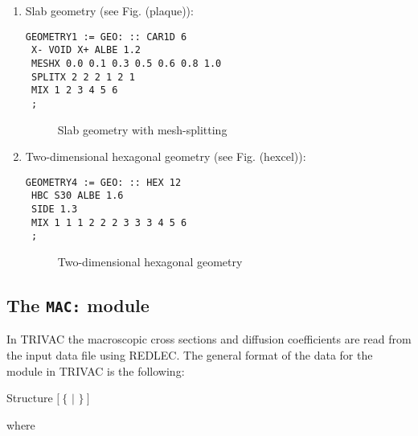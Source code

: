 \begin{enumerate}

\item Slab geometry (see Fig. \fig(plaque)):

\begin{verbatim}
GEOMETRY1 := GEO: :: CAR1D 6
 X- VOID X+ ALBE 1.2
 MESHX 0.0 0.1 0.3 0.5 0.6 0.8 1.0
 SPLITX 2 2 2 1 2 1
 MIX 1 2 3 4 5 6
 ;
\end{verbatim}

\begin{figure}[htbp]
\begin{center} 
\epsfxsize=9cm
\centerline{ }
\parbox{14cm}{\caption{Slab geometry with mesh-splitting}
\label{fig:plaque}} 
\end{center} 
\end{figure}
 
\item Two-dimensional hexagonal geometry (see Fig. \fig(hexcel)):

\begin{verbatim}
GEOMETRY4 := GEO: :: HEX 12
 HBC S30 ALBE 1.6
 SIDE 1.3
 MIX 1 1 1 2 2 2 3 3 3 4 5 6
 ;
\end{verbatim}

\begin{figure}[htbp]
\begin{center} 
\epsfxsize=7cm
\centerline{ }
\parbox{14cm}{\caption{Two-dimensional hexagonal geometry}
\label{fig:hexcel}} 
\end{center} 
\end{figure}

\end{enumerate}
\clearpage

\subsection{The {\tt MAC:} module}

In TRIVAC the macroscopic cross sections and diffusion coefficients are read from the input data file using REDLEC. The general format of the data for the  module in TRIVAC is the following:

\begin{DataStructure}{Structure }
 \moc{:=}  $[~\{$  $|$  $\}~]$ \moc{::} 
\end{DataStructure}

\goodbreak
\noindent where

